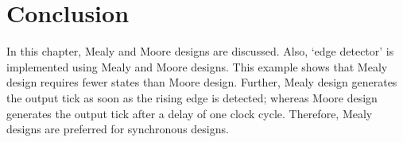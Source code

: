 \section{Conclusion}
In this chapter, Mealy and Moore designs are discussed. Also, `edge detector' is implemented using Mealy and Moore designs. This example shows that Mealy design requires fewer states than Moore design. Further, Mealy design generates the output tick as soon as the rising edge is detected; whereas Moore design generates the output tick after a delay of one clock cycle. Therefore, Mealy designs are preferred for synchronous designs. 

 